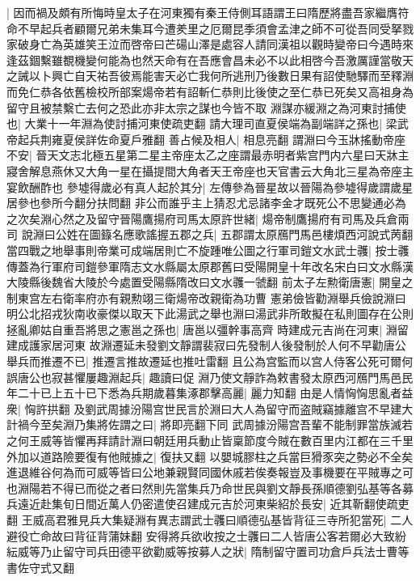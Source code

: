 |{
	因而禍及頗有所悔時皇太子在河東獨有秦王侍側耳語謂王曰隋歷將盡吾家繼膺符命不早起兵者顧爾兄弟未集耳今遭羑里之厄爾昆季須會孟津之師不可從吾同受拏戮家破身亡為英雄笑王泣而啓帝曰芒碭山澤是處容人請同漢祖以觀時變帝曰今遇時來逢茲錮繫雖覩機變何能為也然天命有在吾應會昌未必不以此相啓今吾激厲謹當敬天之誡以卜興亡自天祐吾彼焉能害天必亡我何所逃刑乃後數日果有詔使馳驛而至釋淵而免仁恭各依舊檢校所部案煬帝若有詔斬仁恭則比後使之至仁恭已死矣又高祖身為留守且被禁繫亡去何之恐此亦非太宗之謀也今皆不取}
淵謀亦緩淵之為河東討捕使也|{
	大業十一年淵為使討捕河東使疏吏翻}
請大理司直夏侯端為副端詳之孫也|{
	梁武帝起兵荆雍夏侯詳佐命夏戶雅翻}
善占候及相人|{
	相息亮翻}
謂淵曰今玉牀搖動帝座不安|{
	晉天文志北極五星第二星主帝座太乙之座謂最赤明者紫宫門内六星曰天牀主寢舍解息燕休又大角一星在攝提間大角者天王帝座也天官書云大角北三星為帝座主宴飲酬酢也}
參墟得歲必有真人起於其分|{
	左傳參為晉星故以晉陽為參墟得歲謂歲星居參也參所今翻分扶問翻}
非公而誰乎主上猜忍尤忌諸李金才既死公不思變通必為之次矣淵心然之及留守晉陽鷹揚府司馬太原許世緒|{
	煬帝制鷹揚府有司馬及兵倉兩司}
說淵曰公姓在圖籙名應歌謠握五郡之兵|{
	五郡謂太原鴈門馬邑樓煩西河說式苪翻}
當四戰之地舉事則帝業可成端居則亡不旋踵唯公圖之行軍司鎧文水武士彠|{
	按士彠傳蓋為行軍府司鎧參軍隋志文水縣屬太原郡舊曰受陽開皇十年改名宋白曰文水縣漢大陵縣後魏省大陵於今處置受陽縣隋改曰文水彠一虢翻}
前太子左勲衛唐憲|{
	開皇之制東宫左右衛率府亦有親勲翊三衛煬帝改親衛為功曹}
憲弟儉皆勸淵舉兵儉說淵曰明公北招戎狄南收豪傑以取天下此湯武之舉也淵曰湯武非所敢擬在私則圖存在公則拯亂卿姑自重吾將思之憲邕之孫也|{
	唐邕以彊幹事高齊}
時建成元吉尚在河東|{
	淵留建成護家居河東}
故淵遷延未發劉文靜謂裴寂曰先發制人後發制於人何不早勸唐公舉兵而推遷不已|{
	推遷言推故遷延也推吐雷翻}
且公為宫監而以宫人侍客公死可爾何誤唐公也寂甚懼屢趣淵起兵|{
	趣讀曰促}
淵乃使文靜詐為敕書發太原西河鴈門馬邑民年二十已上五十已下悉為兵期歲暮集涿郡擊高麗|{
	麗力知翻}
由是人情恟恟思亂者益衆|{
	恟許拱翻}
及劉武周據汾陽宫世民言於淵曰大人為留守而盗賊竊據離宫不早建大計禍今至矣淵乃集將佐謂之曰|{
	將即亮翻下同}
武周據汾陽宫吾輩不能制罪當族滅若之何王威等皆懼再拜請計淵曰朝廷用兵動止皆稟節度今賊在數百里内江都在三千里外加以道路險要復有他賊據之|{
	復扶又翻}
以嬰城膠柱之兵當巨猾豕突之勢必不全矣進退維谷何為而可威等皆曰公地兼親賢同國休戚若俟奏報豈及事機要在平賊專之可也淵陽若不得已而從之者曰然則先當集兵乃命世民與劉文靜長孫順德劉弘基等各募兵遠近赴集旬日間近萬人仍密遣使召建成元吉於河東柴紹於長安|{
	近其靳翻使疏吏翻}
王威高君雅見兵大集疑淵有異志謂武士彠曰順德弘基皆背征三寺所犯當死|{
	二人避役亡命故曰背征背蒲妹翻}
安得將兵欲收按之士彠曰二人皆唐公客若爾必大致紛紜威等乃止留守司兵田德平欲勸威等按募人之狀|{
	隋制留守置司功倉戶兵法士曹等書佐守式又翻}
